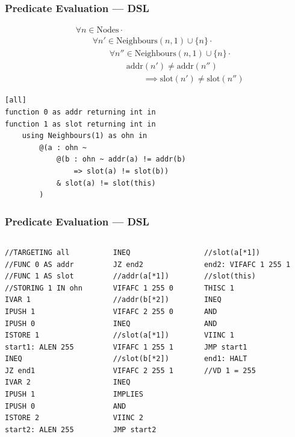 \documentclass[usenames,dvipsnames]{beamer}
\begin{document}
\begin{frame}[fragile]\frametitle{Predicate Evaluation --- DSL}
\begin{align*}
&				\forall n \in \text{Nodes} \cdot \\
& \hspace{2em}		\forall n' \in \text{Neighbours}(n, 1) \cup \{n\} \cdot \\
& \hspace{4em}			\forall n'' \in \text{Neighbours}(n, 1) \cup \{n\} \cdot \\
& \hspace{6em}				\text{addr}(n') \not= \text{addr}(n'') \\
& \hspace{8em}					\implies \text{slot}(n') \neq \text{slot}(n'')
\end{align*}

\begin{center}
\begin{minipage}{0.75\textwidth}
\begin{lstlisting}[language=Hoppy]
[all]
function 0 as addr returning int in
function 1 as slot returning int in
    using Neighbours(1) as ohn in
        @(a : ohn ~
            @(b : ohn ~ addr(a) != addr(b)
                => slot(a) != slot(b))
            & slot(a) != slot(this)
        )
\end{lstlisting}
\end{minipage}
\end{center}
\end{frame}

\begin{frame}[fragile]\frametitle{Predicate Evaluation --- DSL}
\begin{columns}[t]
	\begin{column}[T]{3.1cm}
\begin{lstlisting}[language=Dragon]
//TARGETING all
//FUNC 0 AS addr
//FUNC 1 AS slot
//STORING 1 IN ohn
IVAR 1
IPUSH 1
IPUSH 0
ISTORE 1
start1: ALEN 255
INEQ
JZ end1
IVAR 2
IPUSH 1
IPUSH 0
ISTORE 2
start2: ALEN 255
\end{lstlisting}
	\end{column}
	\begin{column}[T]{2.6cm}
\begin{lstlisting}[language=Dragon]
INEQ
JZ end2
//addr(a[*1])
VIFAFC 1 255 0
//addr(b[*2])
VIFAFC 2 255 0
INEQ
//slot(a[*1])
VIFAFC 1 255 1
//slot(b[*2])
VIFAFC 2 255 1
INEQ
IMPLIES
AND
VIINC 2
JMP start2
\end{lstlisting}
	\end{column}
\begin{column}[T]{3.4cm}
\begin{lstlisting}[language=Dragon]
//slot(a[*1])
end2: VIFAFC 1 255 1
//slot(this)
THISC 1
INEQ
AND
AND
VIINC 1
JMP start1
end1: HALT
//VD 1 = 255
\end{lstlisting}
	\end{column}
	\end{columns}

\end{frame}
\end{document}
